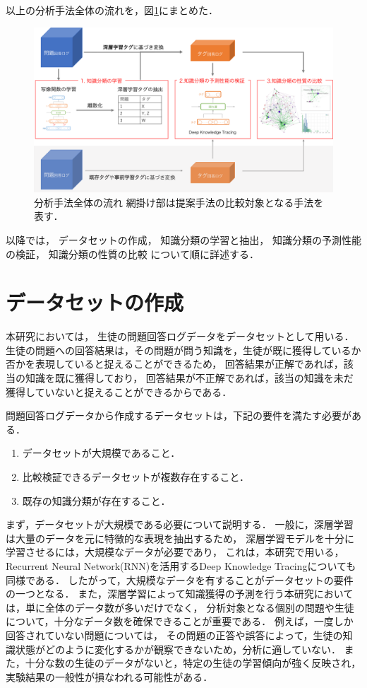 以上の分析手法全体の流れを，図\ref{fig:workflow}にまとめた．
\begin{figure}[htb]
\begin{center}
\includegraphics[width=400pt]{./img/workflow3.png}
\end{center}
\caption{分析手法全体の流れ \newline\small 網掛け部は提案手法の比較対象となる手法を表す．}
\label{fig:workflow}
\end{figure}

以降では，
データセットの作成，
知識分類の学習と抽出，
知識分類の予測性能の検証，
知識分類の性質の比較
について順に詳述する．


\section{データセットの作成}
本研究においては，
生徒の問題回答ログデータをデータセットとして用いる．
生徒の問題への回答結果は，その問題が問う知識を，生徒が既に獲得しているか否かを表現していると捉えることができるため，
回答結果が正解であれば，該当の知識を既に獲得しており，
回答結果が不正解であれば，該当の知識を未だ獲得していないと捉えることができるからである．

問題回答ログデータから作成するデータセットは，下記の要件を満たす必要がある．
\begin{enumerate}
	\item データセットが大規模であること．
	\item 比較検証できるデータセットが複数存在すること．
	\item 既存の知識分類が存在すること．
\end{enumerate}


まず，データセットが大規模である必要について説明する．
一般に，深層学習は大量のデータを元に特徴的な表現を抽出するため，
深層学習モデルを十分に学習させるには，大規模なデータが必要であり，
これは，本研究で用いる，Recurrent Neural Network(RNN)を活用するDeep Knowledge Tracingについても同様である\cite{piech2015deep}．
したがって，大規模なデータを有することがデータセットの要件の一つとなる．
また，深層学習によって知識獲得の予測を行う本研究においては，単に全体のデータ数が多いだけでなく，
分析対象となる個別の問題や生徒について，十分なデータ数を確保できることが重要である．
例えば，一度しか回答されていない問題については，
その問題の正答や誤答によって，生徒の知識状態がどのように変化するかが観察できないため，分析に適していない．
また，十分な数の生徒のデータがないと，特定の生徒の学習傾向が強く反映され，
実験結果の一般性が損なわれる可能性がある．


